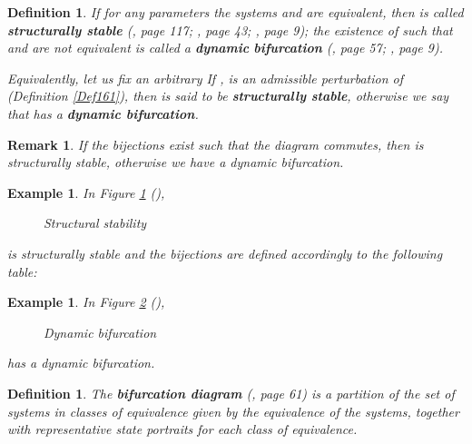 \documentclass[12pt]{article}\usepackage{amsmath}
\newtheorem{definition}[theorem]{Definition}
\newtheorem{example}[theorem]{Example}
\newtheorem{remark}[theorem]{Remark}
\begin{document}
\begin{definition}
If for any parameters  the systems
 and  are
equivalent, then  is called \textbf{structurally stable} (\cite{bib6},
page 117; \cite{bib2}, page 43; \cite{bib5}, page 9); the existence of
 such that  and
 are not equivalent is called a
\textbf{dynamic} \textbf{bifurcation} (\cite{bib1}, page 57; \cite{bib5}, page 9).

Equivalently, let us fix an arbitrary  If
,  is
an admissible perturbation of  (Definition \ref{Def161}),
then  is said to be \textbf{structurally stable}, otherwise we say that
 has a \textbf{dynamic bifurcation}.
\end{definition}

\begin{remark}
If 
the bijections  exist such that  the diagram
commutes, then  is structurally stable, otherwise we have a dynamic bifurcation.
\end{remark}

\begin{example}
In Figure \ref{bifurcation3} (),
\begin{figure}
[ptb]
\begin{center}
\caption{Structural stability}\label{bifurcation3}\end{center}
\end{figure}
 is structurally stable and the bijections  are defined
accordingly to the following table:

\end{example}

\begin{example}
In Figure \ref{bifurcation4} (),\begin{figure}
[ptb]
\begin{center}
\caption{Dynamic bifurcation}\label{bifurcation4}\end{center}
\end{figure}
 has a dynamic bifurcation.
\end{example}

\begin{definition}
The \textbf{bifurcation diagram} (\cite{bib1}, page 61) is a partition of the
set of systems  in
classes of equivalence given by the equivalence of the systems, together with
representative state portraits for each class of equivalence.
\end{definition}
\end{document}
